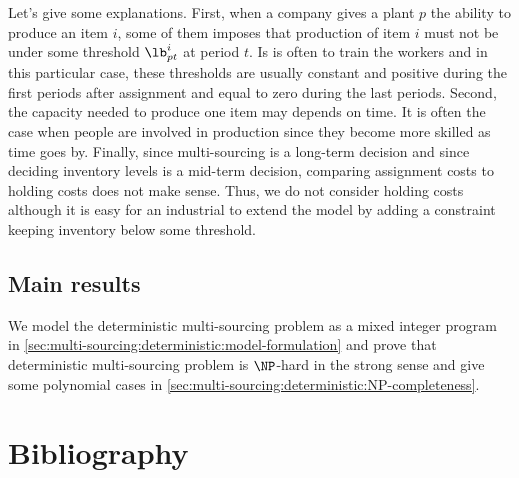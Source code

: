 Let's give some explanations.
First, when a company gives a plant $p$ the ability to produce an item $i$, some of them imposes that production of item $i$ must not be under some threshold $\lb_{pt}^i$ at period $t$.
Is is often to train the workers and in this particular case, these thresholds are usually constant and positive during the first periods after assignment and equal to zero during the last periods.
Second, the capacity needed to produce one item may depends on time.
It is often the case when people are involved in production since they become more skilled as time goes by.
Finally, since multi-sourcing is a long-term decision and since deciding inventory levels is a mid-term decision, comparing assignment costs to holding costs does not make sense.
Thus, we do not consider holding costs although it is easy for an industrial to extend the model by adding a constraint keeping inventory below some threshold.






\subsection{Main results}
\label{sec:multi-sourcing:deterministic:introduction:main_results}


We model the deterministic multi-sourcing problem as a mixed integer program in \cref{sec:multi-sourcing:deterministic:model-formulation} and prove that deterministic multi-sourcing problem is $\NP$-hard in the strong sense and give some polynomial cases in \cref{sec:multi-sourcing:deterministic:NP-completeness}.




\section{Bibliography}



